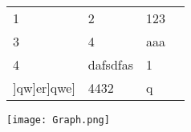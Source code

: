 \documentclass{article}
\begin{document}
\begin {tabular}{ l l l l }
1 & 2 & 123 \\
3 & 4 & aaa \\
4 & dafsdfas & 1 \\
]qw]er]qwe] & 4432 & q \\
\end {tabular}

\texttt{[image: Graph.png]}
\end{document}
